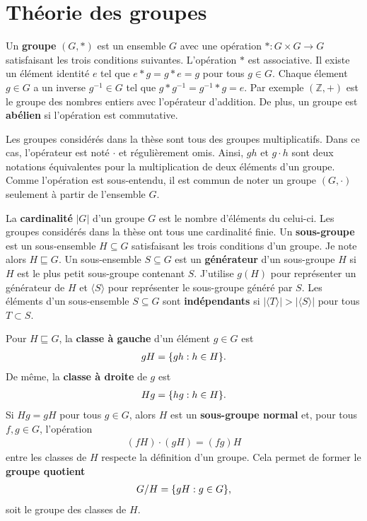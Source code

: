 \chapter{Théorie des groupes}
\label{chap:theo_groupes}

Un \textbf{groupe} $(G, *)$ est un ensemble $G$ avec une opération $* : G \times G \to G$
satisfaisant les trois conditions suivantes.
L'opération $*$ est associative.
Il existe un élément identité $e$ tel que $e * g = g * e = g$ pour tous $g \in G$.
Chaque élement $g \in G$ a un inverse $g^{-1} \in G$ tel que $g * g^{-1} = g^{-1} * g = e$.
Par exemple $(\mathbb Z, +)$ est le groupe des nombres entiers avec l'opérateur d'addition.
De plus, un groupe est \textbf{abélien} si l'opération est commutative.

Les groupes considérés dans la thèse sont tous des groupes multiplicatifs.
Dans ce cas, l'opérateur est noté $\cdot$ et régulièrement omis.
Ainsi, $gh$ et $g \cdot h$ sont deux notations équivalentes pour la multiplication 
de deux éléments d'un groupe.
Comme l'opération est sous-entendu,
il est commun de noter un groupe $(G, \cdot)$ seulement à partir de l'ensemble $G$.

La \textbf{cardinalité} $|G|$ d'un groupe $G$ est le nombre d'éléments du celui-ci.
Les groupes considérés dans la thèse ont tous une cardinalité finie.
Un \textbf{sous-groupe} est un sous-ensemble $H \subseteq G$ satisfaisant les trois conditions
d'un groupe.
Je note alors $H \sqsubseteq G$.
Un sous-ensemble $S \subseteq G$ est un \textbf{générateur} d'un sous-groupe $H$ si $H$ est le plus petit
sous-groupe contenant $S$.
J'utilise $g(H)$ pour représenter un générateur de $H$ 
et $\langle S \rangle$ pour représenter le sous-groupe généré par $S$.
Les éléments d'un sous-ensemble $S \subseteq G$ sont \textbf{indépendants} si 
$|\langle T \rangle| > |\langle S \rangle|$ pour tous $T \subset S$.

Pour $H \sqsubseteq G$,
la \textbf{classe à gauche} d'un élément $g \in G$ est
\begin{align}
  gH = \qty{gh : h \in H}.
\end{align}
De même,
la \textbf{classe à droite} de $g$ est 
\begin{align}
  Hg = \qty{hg : h \in H}.
\end{align}
Si $Hg = gH$ pour tous $g \in G$,
alors $H$ est un \textbf{sous-groupe normal} et,
pour tous $f, g \in G$, l'opération
\begin{align}
  (fH)\cdot(gH) = (fg)H
\end{align}
entre les classes de $H$ respecte la définition d'un groupe.
Cela permet de former le \textbf{groupe quotient} 
\begin{align}
  G / H = \qty{gH : g \in G},
\end{align}
soit le groupe des classes de $H$.

